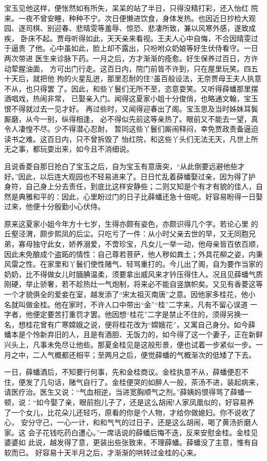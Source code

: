 宝玉见他这样，便怅然如有所失，呆呆的站了半日，只得没精打彩，还入怡红
院来。一夜不曾安睡，种种不宁。次日便懒进饮食，身体发热。也因近日抄检大观
园、逐司棋、别迎春、悲晴雯等羞辱、惊恐、悲凄所致，兼以风寒外感，遂致成疾，
卧床不起。贾母听得如此，天天亲来看视。王夫人心中自悔，不合因晴雯过于逼责
了他。心中虽如此，脸上却不露出，只吩咐众奶娘等好生伏侍看守。一日两次带进
医生来诊脉下药。一月之后，方才渐渐的痊愈。好生保养过百日，方许动荤腥油面，
方可出门行走。这百日内，院门前皆不许到，只在屋里玩笑。四五十天后，就把他
拘的火星乱迸，那里忍耐的住?虽百般设法，无奈贾母王夫人执意不从，也只得罢
了。因此，和些丫鬟们无所不至，恣意耍笑。又听得薛蟠那里摆酒唱戏，热闹非常，
已娶亲入门。闻得这夏家小姐十分俊俏，也略通文翰，宝玉恨不得就过去一见才好。
再过些时，又闻得迎春出了阁。宝玉思及当时姊妹耳鬓厮磨，从今一别，纵得相逢，
必不得似先前这等亲热了。眼前又不能去一望，真令人凄惶不尽。少不得潜心忍耐，
暂同这些丫鬟们厮闹释闷，幸免贾政责备逼迫读书之难。这百日内，只不曾拆毁了
怡红院，和这些丫头们无法无天，凡世上所无之事，都玩耍出来，如今且不消细说。

且说香菱自那日抢白了宝玉之后，自为宝玉有意唐突，“从此倒要远避他些才
好。”因此，以后连大观园也不轻易进来了。日日忙乱着薛蟠娶过亲，因为得了护
身符，自己身上分去责任，到底比这样安静些；二则又知是个有才有貌的佳人，自
然是典雅和平的：因此，心里盼过门的日子比薛蟠还急十倍呢。好容易盼得一日娶
过来，他便十分殷勤小心伏侍。

原来这夏家小姐今年方十七岁，生得亦颇有姿色，亦颇识得几个字。若论心里
的丘壑泾渭，颇步熙凤的后尘。只吃亏了一件：从小时父亲去世的早，又无同胞兄
弟，寡母独守此女，娇养溺爱，不啻珍宝，凡女儿一举一动，他母亲皆百依百顺，
因此未免酿成个盗跖的情性：自己尊若菩萨，他人秽如粪土；外具花柳之姿，内秉
风雷之性。在家里和丫鬟们使性赌气、轻骂重打的。今儿出了阁，自为要作当家的
奶奶，比不得做女儿时腼腆温柔，须要拿出威风来才钤压得住人。况且见薛蟠气质
刚硬，举止骄奢，若不趁热灶一气炮制，将来必不能自竖旗帜矣。又见有香菱这等
一个才貌俱全的爱妾在室，越发添了“宋太祖灭南唐”之意。因他家多桂花，他小
名就叫做金桂。他在家时，不许人口中带出“金”“桂”二字来，凡有不留心误道
一字者，他便定要苦打重罚才罢。他因想“桂花”二字是禁止不住的，须得另换一
名，想桂花曾有广寒嫦娥之说，便将桂花改为“嫦娥花”，又寓自己身分。如今薛
蟠本是个怜新弃旧的人，且是有酒胆、无饭力的，如今得了这一个妻子，正在新鲜
兴头上，凡事未免尽让他些。那夏金桂见是这般形景，便也试着一步紧似一步。一
月之中，二人气概都还相平；至两月之后，便觉薛蟠的气概渐次的低矮了下去。

一日，薛蟠酒后，不知要行何事，先和金桂商议。金桂执意不从，薛蟠便忍不
住，便发了几句话，赌气自行了。金桂便哭的如醉人一般，茶汤不进，装起病来，
请医疗治。医生又说：“气血相逆，当进宽胸顺气之剂。”薛姨妈恨得骂了薛蟠一
顿，说：“如今娶了亲，眼前抱儿子了，还是这么胡闹!人家凤凰似的，好容易养
了一个女儿，比花朵儿还轻巧，原看的你是个人物，才给你做媳妇。你不说收了心，
安分守己，一心一计，和和气气的过日子，还是这么胡闹，喝了黄汤折磨人家。这
会子花钱吃药白遭心。”一席话说的薛蟠后悔不迭，反来安慰金桂。金桂见婆婆如
此说，越发得了意，更装出些张致来，不理薛蟠。薛蟠没了主意，惟有自软而已。
好容易十天半月之后，才渐渐的哄转过金桂的心来。

